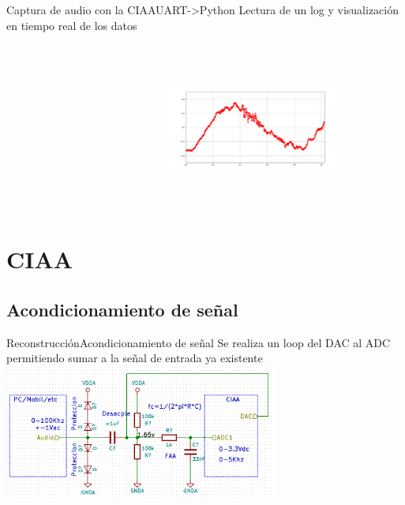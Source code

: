  \begin{frame}{Captura de audio con la CIAA}{UART->Python}
    \handsonicon
    Lectura de un log y visualización en tiempo real de los datos
       \begin{columns}[c]
          \hspace{2pt}
          \begin{column}{.3\textwidth}
             
          \end{column}
          \hspace{2pt}
          \vrule
          \hspace{2pt}
          \begin{column}{.3\textwidth}
             
          \end{column}
          \hspace{2pt}
          \vrule
          \hspace{2pt}
          \begin{column}{.4\textwidth}
             \includegraphics[width=6cm,height=4.8cm]{2_clase/ciaa/psf1/visualize.png}
          \end{column}
          \hspace{2pt}
       \end{columns}
       \vfill
    \end{frame}
 \section{CIAA}
 \subsection{Acondicionamiento de señal}
 \begin{frame}[t]{Reconstrucción}{Acondicionamiento de señal}
    Se realiza un loop del DAC al ADC permitiendo sumar a la señal de entrada ya existente
    \protoboardicon
    \center\includegraphics[width=9cm]{2_clase/circuito_dac}
    \vfill
 \end{frame}
